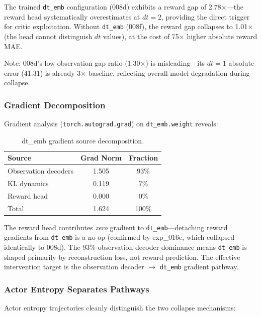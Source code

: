 \documentclass[letterpaper]{article}
\begin{document}
The trained \texttt{dt\_emb} configuration (008d) exhibits a reward gap of 2.78$\times$---the reward head systematically overestimates at $dt{=}2$, providing the direct trigger for critic exploitation.
Without \texttt{dt\_emb} (008f), the reward gap collapses to 1.01$\times$ (the head cannot distinguish $dt$ values), at the cost of 75$\times$ higher absolute reward MAE.

Note: 008d's low observation gap ratio (1.30$\times$) is misleading---its $dt{=}1$ absolute error (41.31) is already 3$\times$ baseline, reflecting overall model degradation during collapse.

\subsubsection{Gradient Decomposition}

Gradient analysis (\texttt{torch.autograd.grad}) on \texttt{dt\_emb.weight} reveals:

\begin{table}[h]
\centering
\caption{dt\_emb gradient source decomposition.}
\label{tab:gradient}
\begin{tabular}{lcc}
\toprule
Source & Grad Norm & Fraction \\
\midrule
Observation decoders & 1.505 & 93\% \\
KL dynamics & 0.119 & 7\% \\
Reward head & 0.000 & 0\% \\
\midrule
Total & 1.624 & 100\% \\
\bottomrule
\end{tabular}
\end{table}

The reward head contributes \emph{zero} gradient to \texttt{dt\_emb}---detaching reward gradients from \texttt{dt\_emb} is a no-op (confirmed by exp\_016e, which collapsed identically to 008d).
The 93\% observation decoder dominance means \texttt{dt\_emb} is shaped primarily by reconstruction loss, not reward prediction.
The effective intervention target is the observation decoder $\to$ \texttt{dt\_emb} gradient pathway.

\subsubsection{Actor Entropy Separates Pathways}

Actor entropy trajectories cleanly distinguish the two collapse mechanisms:
\end{document}
